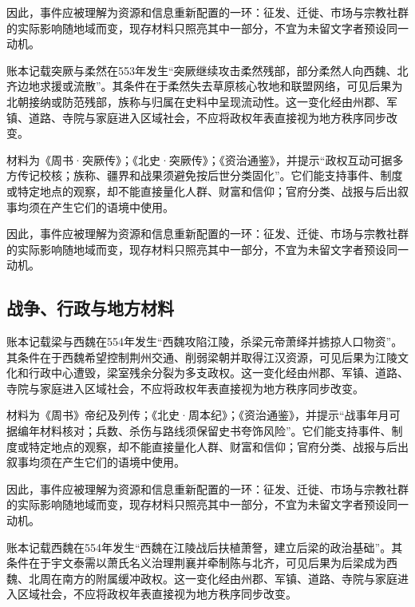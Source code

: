 因此，事件应被理解为资源和信息重新配置的一环：征发、迁徙、市场与宗教社群的实际影响随地域而变，现存材料只照亮其中一部分，不宜为未留文字者预设同一动机。

账本记载突厥与柔然在553年发生“突厥继续攻击柔然残部，部分柔然人向西魏、北齐边地求援或流散”。其条件在于柔然失去草原核心牧地和联盟网络，可见后果为北朝接纳或防范残部，族称与归属在史料中呈现流动性。这一变化经由州郡、军镇、道路、寺院与家庭进入区域社会，不应将政权年表直接视为地方秩序同步改变。

材料为《周书·突厥传》；《北史·突厥传》；《资治通鉴》，并提示“政权互动可据多方传记校核；族称、疆界和战果须避免按后世分类固化”。它们能支持事件、制度或特定地点的观察，却不能直接量化人群、财富和信仰；官府分类、战报与后出叙事均须在产生它们的语境中使用。

因此，事件应被理解为资源和信息重新配置的一环：征发、迁徙、市场与宗教社群的实际影响随地域而变，现存材料只照亮其中一部分，不宜为未留文字者预设同一动机。

\subsection{战争、行政与地方材料}

账本记载梁与西魏在554年发生“西魏攻陷江陵，杀梁元帝萧绎并掳掠人口物资”。其条件在于西魏希望控制荆州交通、削弱梁朝并取得江汉资源，可见后果为江陵文化和行政中心遭毁，梁室残余分裂为多支政权。这一变化经由州郡、军镇、道路、寺院与家庭进入区域社会，不应将政权年表直接视为地方秩序同步改变。

材料为《周书》帝纪及列传；《北史·周本纪》；《资治通鉴》，并提示“战事年月可据编年材料核对；兵数、杀伤与路线须保留史书夸饰风险”。它们能支持事件、制度或特定地点的观察，却不能直接量化人群、财富和信仰；官府分类、战报与后出叙事均须在产生它们的语境中使用。

因此，事件应被理解为资源和信息重新配置的一环：征发、迁徙、市场与宗教社群的实际影响随地域而变，现存材料只照亮其中一部分，不宜为未留文字者预设同一动机。

账本记载西魏在554年发生“西魏在江陵战后扶植萧詧，建立后梁的政治基础”。其条件在于宇文泰需以萧氏名义治理荆襄并牵制陈与北齐，可见后果为后梁成为西魏、北周在南方的附属缓冲政权。这一变化经由州郡、军镇、道路、寺院与家庭进入区域社会，不应将政权年表直接视为地方秩序同步改变。

